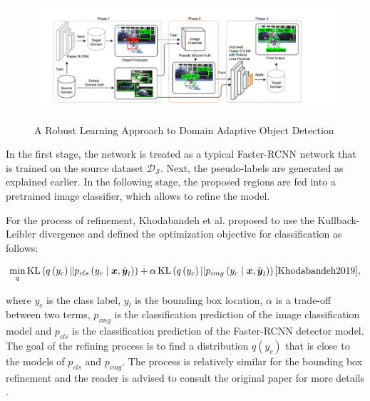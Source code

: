 \documentclass[english, 12pt, a4paper, elec, utf8, a-1b, online]{aaltothesis}
\begin{document}
\begin{figure}[htb]
	\begin{center}
		\includegraphics[width=16cm]{./robust.png}
	\end{center}
	\caption{A Robust Learning Approach to Domain Adaptive Object Detection\cite{Khodabandeh2019}}
	\begin{center}
		\label{robust}
	\end{center}
\end{figure}
\FloatBarrier

In the first stage, the network is treated as a typical Faster-RCNN network that is trained on the source dataset $\mathcal{D_S}$. Next, the pseudo-labels are generated as explained earlier. In the following stage, the proposed regions are fed into a pretrained image classifier, which allows to refine the model.

For the process of refinement, Khodabandeh et al. proposed to use the Kullback-Leibler divergence and defined the optimization objective for classification as follows: 

\begin{equation}
\min _{q} \operatorname{KL}\left(q\left(y_{c}\right) \| p_{c l s}\left(y_{c} \mid \boldsymbol{x}, \tilde{\boldsymbol{y}}_{l}\right)\right)+\alpha \operatorname{KL}\left(q\left(y_{c}\right)|| p_{i m g}\left(y_{c} \mid \boldsymbol{x}, \tilde{\boldsymbol{y}}_{l}\right)\right)
\label{KL_DV} 
\cite{Khodabandeh2019},
\end{equation}

where $y_c$ is the class label, $y_l$ is the bounding box location, $\alpha$ is a trade-off between two terms,  $p_{img}$ is the classification prediction of the image classification model and $p_{cls}$ is the classification prediction of the Faster-RCNN detector model. The goal of the refining process is to find a distribution $q(y_c)$ that is close to the models of $p_{cls}$ and $p_{img}$. The process is relatively similar for the bounding box refinement and the reader is advised to consult the original paper for more details \cite{Khodabandeh2019}.  
\end{document}
